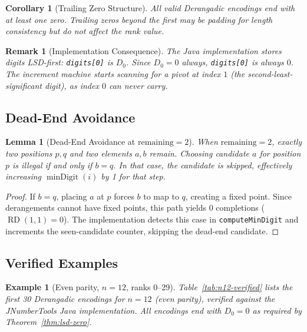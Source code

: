 \documentclass[11pt,a4paper]{article}
\newtheorem{lemma}[theorem]{Lemma}
\newtheorem{corollary}[theorem]{Corollary}
\newtheorem{remark}{Remark}[section]
\newtheorem{example}{Example}[section]
\newcommand{\rder}[2]{\operatorname{RD}(#1,#2)} %
\newcommand{\mind}[1]{\operatorname{minDigit}(#1)}
\begin{document}
    \begin{corollary}[Trailing Zero Structure]
        \label{cor:trailing-zeros}
        All valid Derangadic encodings end with at least one zero. Trailing zeros
        beyond the first may be padding for length consistency but do not affect
        the rank value.
    \end{corollary}

    \begin{remark}[Implementation Consequence]
        The Java implementation stores digits LSD-first: \texttt{digits[0]} is $D_0$.
        Since $D_0 = 0$ always, \texttt{digits[0]} is always $0$. The increment
        machine starts scanning for a pivot at index $1$ (the second-least-significant
        digit), as index $0$ can never carry.
    \end{remark}

    \subsection{Dead-End Avoidance}

    \begin{lemma}[Dead-End Avoidance at $\text{remaining}=2$]
        \label{lem:deadend}
        When $\text{remaining} = 2$, exactly two positions $p, q$ and two elements
        $a, b$ remain. Choosing candidate $a$ for position $p$ is illegal if and only
        if $b = q$. In that case, the candidate is skipped, effectively increasing
        $\mind{i}$ by 1 for that step.
    \end{lemma}

    \begin{proof}
        If $b = q$, placing $a$ at $p$ forces $b$ to map to $q$, creating a fixed point.
        Since derangements cannot have fixed points, this path yields $0$ completions
        ($\rder{1}{1} = 0$). The implementation detects this case in
        \texttt{computeMinDigit} and increments the seen-candidate counter, skipping
        the dead-end candidate.
    \end{proof}

    \subsection{Verified Examples}

    \begin{example}[Even parity, $n=12$, ranks 0--29]
        \label{ex:n12-verified}
        Table~\ref{tab:n12-verified} lists the first 30 Derangadic encodings for
        $n=12$ (even parity), verified against the JNumberTools Java implementation.
        All encodings end with $D_0 = 0$ as required by Theorem~\ref{thm:lsd-zero}.
    \end{example}
\end{document}
